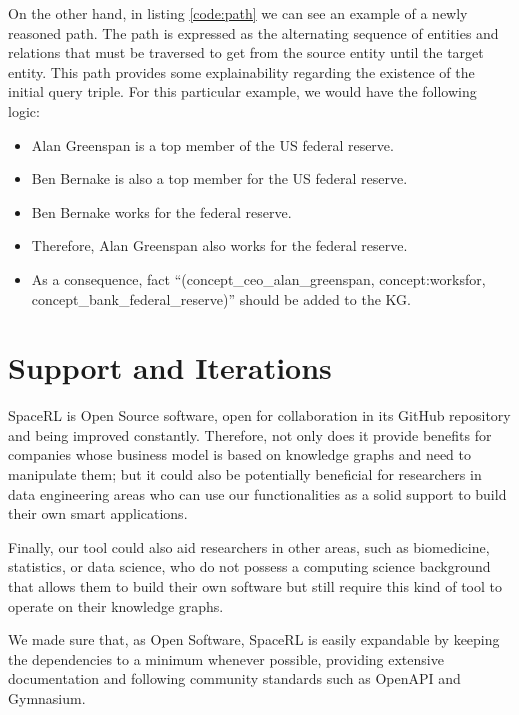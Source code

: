 On the other hand, in listing \ref{code:path} we can see an example of a newly reasoned path. The path is expressed as the alternating sequence of entities and relations that must be traversed to get from the source entity until the target entity. This path provides some explainability regarding the existence of the initial query triple. For this particular example, we would have the following logic:

\begin{itemize}
    \item Alan Greenspan is a top member of the US federal reserve.
    \item Ben Bernake is also a top member for the US federal reserve.
    \item Ben Bernake works for the federal reserve.
    \item Therefore, Alan Greenspan also works for the federal reserve.
    \item As a consequence, fact ``(concept\_ceo\_alan\_greenspan, concept:worksfor,\\  concept\_bank\_federal\_reserve)'' should be added to the KG.
\end{itemize}

\section{Support and Iterations}\label{sec:framework-future}

SpaceRL is Open Source software, open for collaboration in its GitHub repository
\cite{SpaceRL}
and being improved constantly. Therefore, not only does it provide benefits for companies whose business model is based on knowledge graphs and need to manipulate them; but it could also be potentially beneficial for researchers in data engineering areas who can use our functionalities as a solid support to build their own smart applications.

Finally, our tool could also aid researchers in other areas, such as biomedicine, statistics, or data science, who do not possess a computing science background that allows them to build their own software but still require this kind of tool to operate on their knowledge graphs.


We made sure that, as Open Software, SpaceRL is easily expandable by keeping the dependencies to a minimum whenever possible, providing extensive documentation and following community standards such as OpenAPI and Gymnasium.

